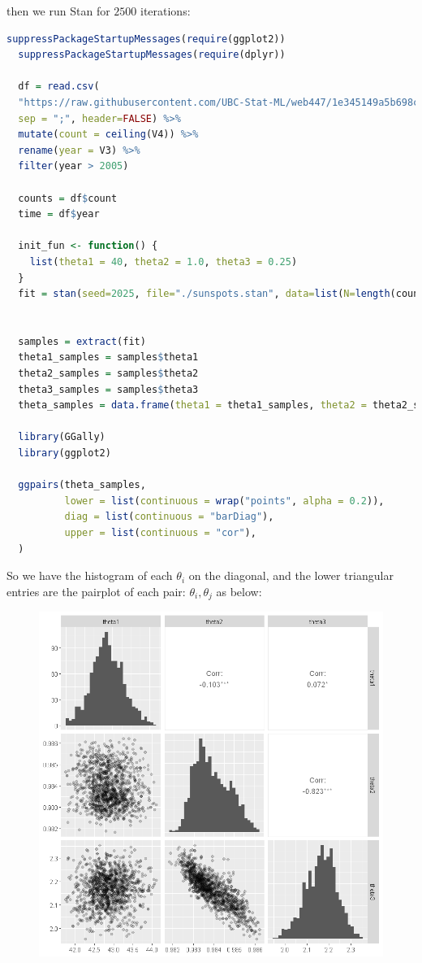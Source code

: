 \documentclass{article}
\begin{document}
then we run Stan for $2500$ iterations:
\begin{lstlisting}[language=R]
  suppressPackageStartupMessages(require(ggplot2))
  suppressPackageStartupMessages(require(dplyr))

  df = read.csv(
  "https://raw.githubusercontent.com/UBC-Stat-ML/web447/1e345149a5b698ccdf0a7e9b0aeabec2463c50ca/data/sunspots-SN_m_tot_V2.0.csv",
  sep = ";", header=FALSE) %>%
  mutate(count = ceiling(V4)) %>%
  rename(year = V3) %>%
  filter(year > 2005)

  counts = df$count 
  time = df$year

  init_fun <- function() {
    list(theta1 = 40, theta2 = 1.0, theta3 = 0.25)
  }
  fit = stan(seed=2025, file="./sunspots.stan", data=list(N=length(counts),y=counts), chains=1, iter=2500, init = init_fun)


  samples = extract(fit)
  theta1_samples = samples$theta1
  theta2_samples = samples$theta2
  theta3_samples = samples$theta3
  theta_samples = data.frame(theta1 = theta1_samples, theta2 = theta2_samples, theta3 = theta3_samples)

  library(GGally)
  library(ggplot2)

  ggpairs(theta_samples, 
          lower = list(continuous = wrap("points", alpha = 0.2)),
          diag = list(continuous = "barDiag"),
          upper = list(continuous = "cor"),
  )
\end{lstlisting}
So we have the histogram of each $\theta_i$ on the diagonal, and the lower triangular entries are the pairplot of each pair: $\theta_i, \theta_j$ as below:
\begin{figure}[H]
  \centering
  \includegraphics[width=\textwidth]{pairplot.png}
  \caption{}
  \label{}
\end{figure}













 
\end{document}
